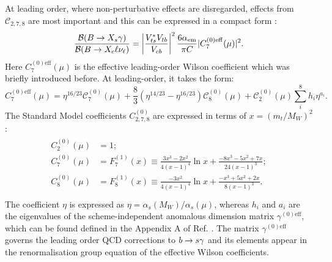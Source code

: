 At leading order, where non-perturbative effects are disregarded, effects from $\mathcal{C}_{2,7,8}$ are most important and this can be expressed in a compact form \cite{Buras:1993xp}:
\begin{equation}\label{eq:total_decay_rate_leading_order}
    \frac{\mathcal{B}(\BtoXsgamma)}{\mathcal{B}(\B\to X_c\ell\nu_\ell)} = \left|\frac{V_{ts}^*V_{tb}}{V_{cb}}\right|^2\frac{6\alpha_{\mathrm{em}}}{\pi C}|C_{7}^{(0)\mathrm{eff}}(\mu)|^2.
\end{equation}
Here $C_{7}^{(0)\mathrm{eff}}(\mu)$ is the effective leading-order Wilson coefficient which was briefly introduced before.
At leading-order, it takes the form:
\begin{equation}\label{eq:effective_c7}
    C_{7}^{(0)\mathrm{eff}}(\mu) = \eta^{16/23}\mathcal{C}^{(0)}_7(\mu) + \frac{8}{3} \left(\eta^{14/23}-\eta^{16/23}\right)\mathcal{C}^{(0)}_8(\mu) + \mathcal{C}^{(0)}_2(\mu) \sum_i^8h_i\eta^{a_i}.
\end{equation}
The Standard Model coefficients $C_{2,7,8}^{(0)}$ are expressed in terms of $x=(m_t/M_W)^2$:
\begin{align}\label{eq:leading_order_wilson_coeffs}
    \begin{split}
    C_2^{(0)}(\mu) &= 1;\\
    C_7^{(0)}(\mu) &= F_7^{(1)}(x) \equiv \frac{3x^3-2x^2}{4(x-1)^4}\ln x + \frac{-8x^3-5x^2+7x}{24(x-1)^3};\\
    C_8^{(0)}(\mu) &= F_8^{(1)}(x) \equiv \frac{-3x^2}{4(x-1)^4}\ln x + \frac{-x^3+5x^2+2x}{8(x-1)^3}.\\
    \end{split}
\end{align}
The coefficient $\eta$ is expressed as $\eta=\alpha_s(M_W)/\alpha_s(\mu)$, whereas $h_i$ and $a_i$ are the eigenvalues of the scheme-independent anomalous dimension matrix $\gamma^{(0)\mathrm{eff}}$, which can be found defined in the Appendix A of Ref. \cite{Buras:1993xp}.
The matrix $\gamma^{(0)\mathrm{eff}}$ governs the leading order QCD corrections to $b\rightarrow s\gamma$ and its elements appear in the renormalisation group equation of the effective Wilson coefficients.


